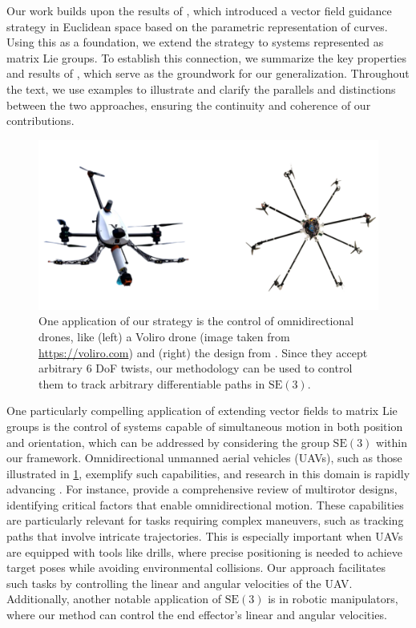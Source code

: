 Our work builds upon the results of \citet{Rezende2022}, which introduced a vector field guidance strategy in Euclidean space based on the parametric representation of curves. Using this as a foundation, we extend the strategy to systems represented as matrix Lie groups. To establish this connection, we summarize the key properties and results of \citet{Rezende2022}, which serve as the groundwork for our generalization. Throughout the text, we use examples to illustrate and clarify the parallels and distinctions between the two approaches, ensuring the continuity and coherence of our contributions.
\begin{figure}[ht]
    \centering
    \includegraphics[width=.8\columnwidth]{figures/example_omnidirecitonal_wobg.png}
    \caption{One application of our strategy is the control of omnidirectional drones, like (left) a Voliro drone (image taken from \url{https://voliro.com}) and (right) the design from \citet{HamandiOmni}. Since they accept arbitrary $6$ DoF twists, our methodology can be used to control them to track arbitrary differentiable paths in $\text{SE}(3)$.}
    \label{fig:omnidirectionaldrone}
\end{figure}
One particularly compelling application of extending vector fields to matrix Lie groups is the control of systems capable of simultaneous motion in both position and orientation, which can be addressed by considering the group $\text{SE}(3)$ within our framework. Omnidirectional unmanned aerial vehicles (UAVs), such as those illustrated in \cref{fig:omnidirectionaldrone}, exemplify such capabilities, and research in this domain is rapidly advancing \citep{kamel2018voliro,Aboudorra2023,HamandiOmni}. For instance, \citet{hamandi2021design} provide a comprehensive review of multirotor designs, identifying critical factors that enable omnidirectional motion. These capabilities are particularly relevant for tasks requiring complex maneuvers, such as tracking paths that involve intricate trajectories. This is especially important when UAVs are equipped with tools like drills, where precise positioning is needed to achieve target poses while avoiding environmental collisions. Our approach facilitates such tasks by controlling the linear and angular velocities of the UAV. Additionally, another notable application of $\text{SE}(3)$ is in robotic manipulators, where our method can control the end effector's linear and angular velocities.

